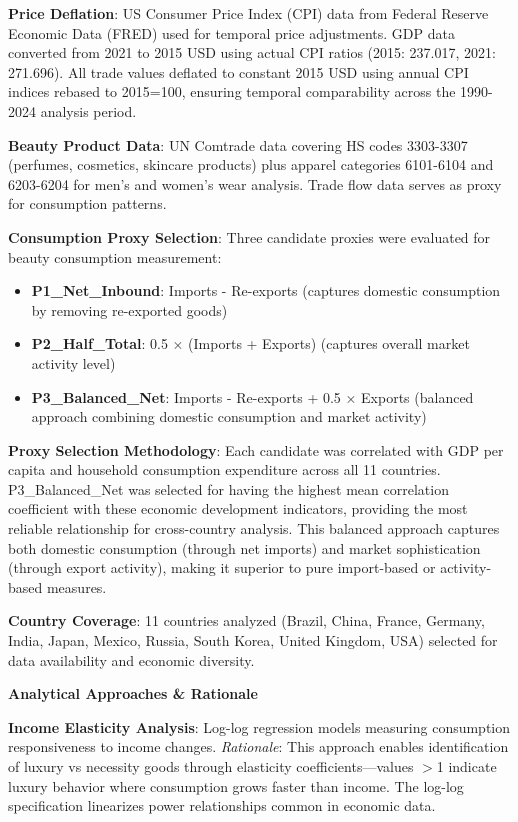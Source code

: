 \documentclass[11pt]{article}
\begin{document}
\textbf{Price Deflation}: US Consumer Price Index (CPI) data from Federal Reserve Economic Data (FRED) used for temporal price adjustments. GDP data converted from 2021 to 2015 USD using actual CPI ratios (2015: 237.017, 2021: 271.696). All trade values deflated to constant 2015 USD using annual CPI indices rebased to 2015=100, ensuring temporal comparability across the 1990-2024 analysis period.

\textbf{Beauty Product Data}: UN Comtrade data covering HS codes 3303-3307 (perfumes, cosmetics, skincare products) plus apparel categories 6101-6104 and 6203-6204 for men's and women's wear analysis. Trade flow data serves as proxy for consumption patterns.

\textbf{Consumption Proxy Selection}: Three candidate proxies were evaluated for beauty consumption measurement:
\begin{itemize}
    \item \textbf{P1\_Net\_Inbound}: Imports - Re-exports (captures domestic consumption by removing re-exported goods)
    \item \textbf{P2\_Half\_Total}: 0.5 × (Imports + Exports) (captures overall market activity level)
    \item \textbf{P3\_Balanced\_Net}: Imports - Re-exports + 0.5 × Exports (balanced approach combining domestic consumption and market activity)
\end{itemize}

\textbf{Proxy Selection Methodology}: Each candidate was correlated with GDP per capita and household consumption expenditure across all 11 countries. P3\_Balanced\_Net was selected for having the highest mean correlation coefficient with these economic development indicators, providing the most reliable relationship for cross-country analysis. This balanced approach captures both domestic consumption (through net imports) and market sophistication (through export activity), making it superior to pure import-based or activity-based measures.

\textbf{Country Coverage}: 11 countries analyzed (Brazil, China, France, Germany, India, Japan, Mexico, Russia, South Korea, United Kingdom, USA) selected for data availability and economic diversity.

\textbf{Analytical Approaches \& Rationale}

\textbf{Income Elasticity Analysis}: Log-log regression models measuring consumption responsiveness to income changes. \textit{Rationale}: This approach enables identification of luxury vs necessity goods through elasticity coefficients—values $>$1 indicate luxury behavior where consumption grows faster than income. The log-log specification linearizes power relationships common in economic data.
\end{document}
